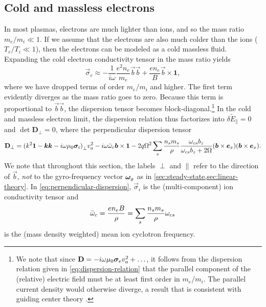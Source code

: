 \documentclass[aps,pre,notitlepage,amsmath,amssymb,amsfonts,nobibnotes,nofootinbib,superscriptaddress]{revtex4-1}
\begin{document}
\subsection{Cold and massless electrons}
\label{sec:cold-e}

In most plasmas, electrons are much lighter than ions, and so the mass ratio
$m_e/m_i\ll1$. If we assume that the electrons are also much colder than the
ions ($T_e/T_i\ll1$), then the electrons can be modeled as a cold massless
fluid. Expanding the cold electron conductivity tensor in the mass ratio
yields
\begin{equation}
  \label{eq:cold-electron-conductivity}
  \vec{\sigma}_e \approx -\frac{1}{i\omega}\frac{e^2n_e}{m_e}\vec{b}\vec{b}
  + \frac{en_e}{B}\vec{b}\times\mathbf{1},
\end{equation}
where we have dropped terms of order $m_e/m_i$ and higher. The first term
evidently diverges as the mass ratio goes to zero. Because this term is
proportional to $\vec{b}\vec{b}$, the dispersion tensor becomes
block-diagonal.\footnote{We note that since
  $\mathbf{D}=-i\omega\mu_0\bm{\sigma}_ev_a^2+\ldots$, it follows from the
  dispersion relation given in \cref{eq:dispersion-relation} that the parallel
  component of the (relative) electric field must be at least first order in
  $m_e/m_i$. The parallel current density would otherwise diverge, a result
  that is consistent with guiding center theory \citep[e.g.][]{Grad1961}.} In
the cold and massless electron limit, the dispersion relation thus factorizes
into $\delta{}\tilde{E}_\parallel=0$ and $\det\mathbf{D}_\perp=0$, where the
perpendicular dispersion tensor
\begin{equation}
  \label{eq:perpendicular-dispersion}
  \mathbf{D}_\perp =
  {(k^2\mathbf{1} - \vec{k}\vec{k} - i\omega\mu_0\vec{\sigma}_i)}_\perp\va^2
  - i\omega\ome\vec{b}\times\mathbf{1}
  - 2q\Omega^2\sums\frac{n_s{}m_s}{\rho}\frac{\omcs b_z}{\omcs b_z + 2\Omega}
  (\vec{b}\times\ex)(\vec{b}\times\ex).
\end{equation}
We note that throughout this section, the labels $\perp$ and $\parallel$ refer
to the direction of $\vec{b}$, \emph{not} to the gyro-frequency vector $\bm{\omega}_g$
as in \cref{sec:steady-state,sec:linear-theory}. In
\cref{eq:perpendicular-dispersion}, $\vec{\sigma}_i$ is the (multi-component)
ion conductivity tensor and
\begin{equation}
  \bar{\omega}_c = \frac{en_e B}{\rho} = \sum_s\frac{n_s m_s}{\rho}\omega_{cs}
\end{equation}
is the (mass density weighted) mean ion cyclotron frequency.
\end{document}

